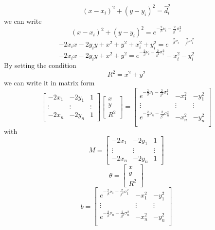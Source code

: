 \documentclass[12pt,twoside]{report}
\begin{document}
\begin{equation}
    (x-x_i)^2+(y-y_i)^2=\hat{d}_i^2
\end{equation}
we can write
\begin{equation}
    (x-x_i)^2+(y-y_i)^2=e^{-\frac{2}{\beta}\nu_i-\frac{2}{\beta^2}\sigma^2_i}
\end{equation}
\begin{equation}
    -2x_ix-2y_iy+x^2+y^2+x_i^2+y_i^2=e^{-\frac{2}{\beta}\nu_i-\frac{2}{\beta^2}\sigma^2_i}
\end{equation}
\begin{equation}
    -2x_ix-2y_iy+x^2+y^2=e^{-\frac{2}{\beta}\nu_i-\frac{2}{\beta^2}\sigma^2_i}-x_i^2-y_i^2
\end{equation}
By setting the condition 
\begin{equation}
R^2=x^2+y^2    
\label{eq:10}
\end{equation}
we can write it in matrix form
\begin{equation}
    \begin{bmatrix}
        -2x_1 & -2y_1 & 1\\
        \vdots&\vdots&\vdots\\
        -2x_n & -2y_n & 1
    \end{bmatrix}
    \begin{bmatrix}
        x\\
        y\\
        R^2
    \end{bmatrix} = 
    \begin{bmatrix}
       e^{-\frac{2}{\beta}\nu_1-\frac{2}{\beta^2}\sigma^2_1} & -x_1^2 & -y_1^2\\
        \vdots&\vdots&\vdots\\
        e^{-\frac{2}{\beta}\nu_n-\frac{2}{\beta^2}\sigma^2_n} & -x_n^2 & -y_n^2\\
    \end{bmatrix}
\end{equation}
with $$M=\begin{bmatrix}
        -2x_1 & -2y_1 & 1\\
        \vdots&\vdots&\vdots\\
        -2x_n & -2y_n & 1
    \end{bmatrix}$$
$$\theta =     \begin{bmatrix}
        x\\
        y\\
        R^2
    \end{bmatrix}$$
$$b=    \begin{bmatrix}
        e^{-\frac{2}{\beta}\nu_1-\frac{2}{\beta^2}\sigma^2_1} & -x_1^2 & -y_1^2\\
        \vdots&\vdots&\vdots\\
        e^{-\frac{2}{\beta}\nu_n-\frac{2}{\beta^2}\sigma^2_n} & -x_n^2 & -y_n^2\\
    \end{bmatrix}$$
\end{document}
